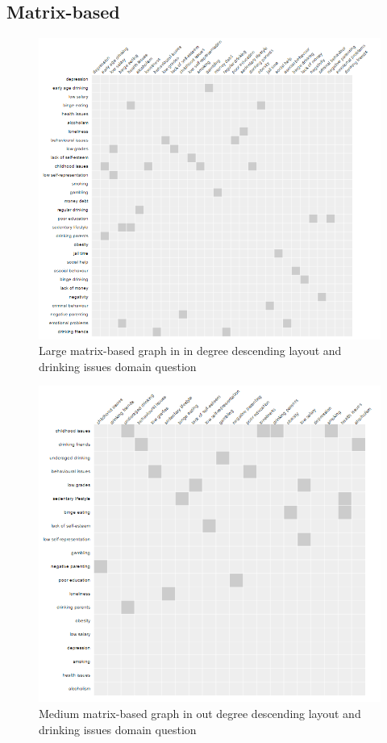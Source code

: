 \documentclass{l4proj}
\begin{document}
\begin{appendices}
\section{Matrix-based}

\begin{figure}[H]
\centering
\includegraphics[width=16cm]{images/drinkingLargeInDD.PNG}
\caption{Large matrix-based graph in in degree descending layout and drinking issues domain question}
\label{drinkingLargeInDD}
\end{figure}


\begin{figure}[H]
\centering
\includegraphics[width=16cm]{images/drinkingMedOutDD.PNG}
\caption{Medium matrix-based graph in out degree descending layout and drinking issues domain question}
\label{drinkingMedOutDD}
\end{figure}


\end{appendices}
\end{document}
